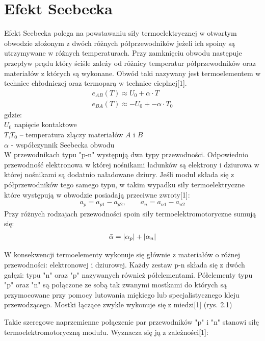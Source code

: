 \documentclass[oneside]{mgr}
\begin{document}
\section{Efekt Seebecka}
Efekt Seebecka polega na powstawaniu siły termoelektrycznej w otwartym obwodzie złożonym z dwóch różnych półprzewodników jeżeli ich spoiny są utrzymywane w różnych temperaturach. Przy zamknięciu obwodu następuje przepływ prądu który ściśle zależy od różnicy temperatur półprzewodników oraz materiałów z których są wykonane. Obwód taki nazywany jest termoelementem w technice chłodniczej oraz termoparą w technice cieplnej[1].
\begin{eqnarray}
    e_{AB}(T) \approx U_0 + \alpha \cdot T\\
    e_{BA}(T) \approx -U_0 + -\alpha \cdot T_0 \nonumber
\end{eqnarray}
gdzie: \\
$U_0$ napięcie kontaktowe \\
$T$,$T_0$ – temperatura złączy materiałów $A$ i $B$ \\
$\alpha$ - współczynnik Seebecka obwodu \\

W przewodnikach typu "p-n" występują dwa typy przewodności. Odpowiednio przewodność elektronowa w której nośnikami ładunków są elektrony i dziurowa w której nośnikami są dodatnio naładowane dziury. Jeśli moduł składa się z półprzewodników tego samego typu, w takim wypadku siły termoelektryczne które występują w obwodzie posiadają przeciwne zwroty[1]:
\begin{eqnarray}
    a_p=a_{p1}-a_{p2}, \qquad a_n=a_{n1}-a_{n2}
\end{eqnarray}
Przy różnych rodzajach przewodności spoin siły termoelektromotoryczne sumują się:
\begin{eqnarray}
    \Bar{\alpha}=|\alpha_p|+|\alpha_n|
\end{eqnarray}

W konsekwencji termoelementy wykonuje się głównie z materiałów o różnej przewodności: elektronowej i dziurowej. Każdy zestaw p-n składa się z dwóch gałęzi: typu "n" oraz "p" nazywanych również półelementami. Półelementy typu "p" oraz "n" są połączone ze sobą tak zwanymi mostkami do których są przymocowane przy pomocy lutowania miękiego lub specjalistycznego kleju przewodzącego. Mostki łączące zwykle wykonuje się z miedzi[1] (rys. 2.1)

Takie szeregowe naprzemienne połączenie par przewodników "p" i "n" stanowi siłę termoelektromotoryczną modułu. Wyznacza się ją z zależności[1]:
\end{document}
